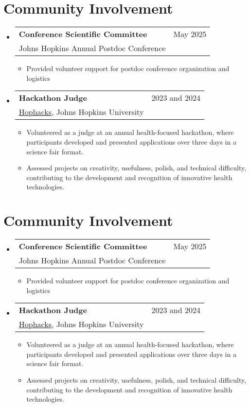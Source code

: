 \documentclass[A4,11pt]{article}
\makeatletter
\newcommand{\CVItem}[1]{
  \item\small{
    {#1 \vspace{-2pt}}
  }
}
\newcommand{\CVSubheading}[4]{
  \vspace{-2pt}\item
    \begin{tabular*}{0.97\textwidth}[t]{l@{\extracolsep{\fill}}r}
      \textbf{#1} & #2 \\
      \small#3 & \small #4 \\
    \end{tabular*}\vspace{-7pt}
}
\newcommand{\CVSubHeadingListStart}{\begin{itemize}[leftmargin=0.5cm, label={}]}
\newcommand{\CVSubHeadingListEnd}{\end{itemize}}
\newcommand{\CVItemListStart}{\begin{itemize}}
\newcommand{\CVItemListEnd}{\end{itemize}\vspace{-5pt}}
\makeatother
\begin{document}
  \section{Community Involvement}
  \CVSubHeadingListStart
  \CVSubheading
  {Conference Scientific Committee} {May 2025}
  {Johns Hopkins Annual Postdoc Conference}{}
  \CVItemListStart
  \CVItem{Provided volunteer support for postdoc conference organization and logistics}
  \CVItemListEnd
  \CVSubheading
  {Hackathon Judge} {2023 and 2024}
  {\href{https://www.hophacks.com/}{Hophacks}, Johns Hopkins University}{}
  \CVItemListStart
  \CVItem{Volunteered as a judge at an annual health-focused hackathon, where participants developed and presented applications over three days in a science fair format.}
  \CVItem{Assessed projects on creativity, usefulness, polish, and technical difficulty, contributing to the development and recognition of innovative health technologies.}
  \CVItemListEnd
  \CVSubHeadingListEnd


\begin{comment}
\section{Community Involvement}
  \CVSubHeadingListStart
    \CVSubheading
      {Austin College Community Tutors}{Fall 2017 -- Fall 2018}
      {Free tutoring for local students in science and mathematics}{Sherman, TX}
    \CVSubheading
      {River Legacy Nature Center}{September 2015 -- August 2016}
      {Provided assistance for various youth science education programs}{Arlington, TX}
    \CVSubheading
      {Back on My Feet Run Club}{April 2014 -- August 2015}
      {Helping to reestablish homeless persons in the community}{Austin, TX}
  \CVSubHeadingListEnd
\end{comment}

  \section{Community Involvement}
  \CVSubHeadingListStart
  \CVSubheading
  {Conference Scientific Committee} {May 2025}
  {Johns Hopkins Annual Postdoc Conference}{}
  \CVItemListStart
  \CVItem{Provided volunteer support for postdoc conference organization and logistics}
  \CVItemListEnd
  \CVSubheading
  {Hackathon Judge} {2023 and 2024}
  {\href{https://www.hophacks.com/}{Hophacks}, Johns Hopkins University}{}
  \CVItemListStart
  \CVItem{Volunteered as a judge at an annual health-focused hackathon, where participants developed and presented applications over three days in a science fair format.}
  \CVItem{Assessed projects on creativity, usefulness, polish, and technical difficulty, contributing to the development and recognition of innovative health technologies.}
  \CVItemListEnd
  \CVSubHeadingListEnd
\end{document}

